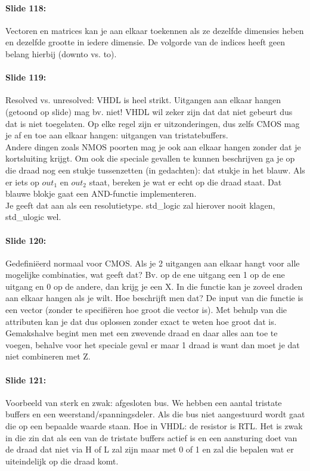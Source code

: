 \documentclass[10pt,a4paper]{book}
\begin{document}
\paragraph{Slide 118:} Vectoren en matrices kan je aan elkaar toekennen als ze dezelfde dimensies heben en dezelfde grootte in iedere dimensie. De volgorde van de indices heeft geen belang hierbij (downto vs. to).

\paragraph{Slide 119:} Resolved vs. unresolved: VHDL is heel strikt. Uitgangen aan elkaar hangen (getoond op slide) mag bv. niet! VHDL wil zeker zijn dat dat niet gebeurt dus dat is niet toegelaten. Op elke regel zijn er uitzonderingen, dus zelfs CMOS mag je af en toe aan elkaar hangen: uitgangen van tristatebuffers.\\
Andere dingen zoals NMOS poorten mag je ook aan elkaar hangen zonder dat je kortsluiting krijgt. Om ook die speciale gevallen te kunnen beschrijven ga je op die draad nog een stukje tussenzetten (in gedachten): dat stukje in het blauw. Als er iets op $out_1$ en $out_2$ staat, bereken je wat er echt op die draad staat. Dat blauwe blokje gaat een AND-functie implementeren.\\
Je geeft dat aan als een resolutietype. std\_logic zal hierover nooit klagen, std\_ulogic wel.

\paragraph{Slide 120:} Gedefini\"eerd normaal voor CMOS. Als je 2 uitgangen aan elkaar hangt voor alle mogelijke combinaties, wat geeft dat? Bv. op de ene uitgang een 1 op de ene uitgang en 0 op de andere, dan krijg je een X. In die functie kan je zoveel draden aan elkaar hangen als je wilt. Hoe beschrijft men dat? De input van die functie is een vector (zonder te specifi\"eren hoe groot die vector is). Met behulp van die attributen kan je dat dus oplossen zonder exact te weten hoe groot dat is.\\
Gemakshalve begint men met een zwevende draad en daar alles aan toe te voegen, behalve voor het speciale geval er maar 1 draad is want dan moet je dat niet combineren met Z. 

\paragraph{Slide 121:} Voorbeeld van sterk en zwak: afgesloten bus. We hebben een aantal tristate buffers en een weerstand/spanningsdeler. Als die bus niet aangestuurd wordt gaat die op een bepaalde waarde staan. Hoe in VHDL: de resistor is RTL. Het is zwak in die zin dat als een van de tristate buffers actief is en een aansturing doet van de draad dat niet via H of L zal zijn maar met 0 of 1 en zal die bepalen wat er uiteindelijk op die draad komt. 
\end{document}
